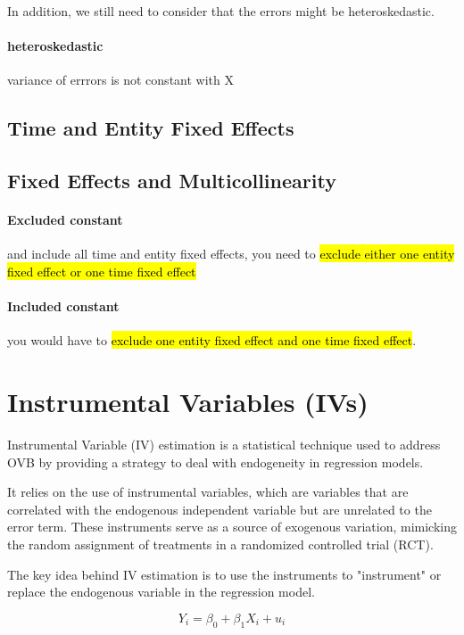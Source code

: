 \documentclass[a3paper, 8pt]{extarticle}
\begin{document}
\begin{multicols*}{5}
In addition, we still need to consider that the errors might be heteroskedastic.

\paragraph{heteroskedastic} variance of errrors is not constant with X

\subsection{Time and Entity Fixed Effects}



\subsection{Fixed Effects and Multicollinearity}
\paragraph{Excluded constant} and include all time and entity fixed effects, you need to \hl{exclude either one entity fixed effect or one time fixed effect}

\paragraph{Included constant} you would have to \hl{exclude one entity fixed effect and one time fixed effect}.



\section{Instrumental Variables (IVs)}

Instrumental Variable (IV) estimation is a statistical technique used to address OVB by providing a strategy to deal with endogeneity in regression models.

It relies on the use of instrumental variables, which are variables that are correlated with the endogenous independent variable but are unrelated to the error term. These instruments serve as a source of exogenous variation, mimicking the random assignment of treatments in a randomized controlled trial (RCT).

The key idea behind IV estimation is to use the instruments to "instrument" or replace the endogenous variable in the regression model.


$$Y_i =\beta_0+\beta_1 X_i+u_i$$


\end{multicols*}
\end{document}
